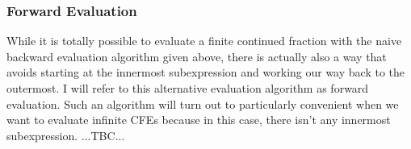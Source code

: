 



\subsubsection{Forward Evaluation}
While it is totally possible to evaluate a finite continued fraction with the naive backward evaluation algorithm given above, there is actually also a way that avoids starting at the innermost subexpression and working our way back to the outermost. I will refer to this alternative evaluation algorithm as forward evaluation. Such an algorithm will turn out to particularly convenient when we want to evaluate infinite CFEs because in this case, there isn't any innermost subexpression. ...TBC...



